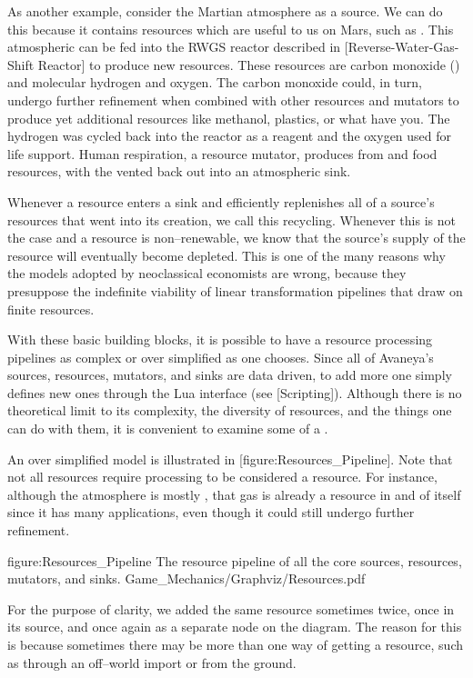 As another example, consider the Martian atmosphere as a source. We can do this because it contains resources which are useful to us on Mars, such as . This atmospheric  can be fed into the RWGS reactor described in [Reverse-Water-Gas-Shift Reactor] to produce new resources. These resources are carbon monoxide () and molecular hydrogen and oxygen. The carbon monoxide could, in turn, undergo further refinement when combined with other resources and mutators to produce yet additional resources like methanol, plastics, or what have you. The hydrogen was cycled back into the reactor as a reagent and the oxygen used for life support. Human respiration, a resource mutator, produces  from  and food resources, with the  vented back out into an atmospheric sink.

Whenever a resource enters a sink and efficiently replenishes all of a source's resources that went into its creation, we call this recycling. Whenever this is not the case and a resource is non--renewable, we know that the source's supply of the resource will eventually become depleted. This is one of the many reasons why the models adopted by neoclassical economists are wrong, because they presuppose the indefinite viability of linear transformation pipelines that draw on finite resources.

With these basic building blocks, it is possible to have a resource processing pipelines as complex or over simplified as one chooses. Since all of Avaneya's sources, resources, mutators, and sinks are data driven, to add more one simply defines new ones through the Lua interface (see [Scripting]). Although there is no theoretical limit to its complexity, the diversity of resources, and the things one can do with them, it is convenient to examine some of a .

An over simplified model is illustrated in [figure:Resources_Pipeline]. Note that not all resources require processing to be considered a resource. For instance, although the atmosphere is mostly , that gas is already a resource in and of itself since it has many applications, even though it could still undergo further refinement.

\FullPageDiagram
    {figure:Resources_Pipeline}
    {The resource pipeline of all the core sources, resources, mutators, and sinks.}
    {Game_Mechanics/Graphviz/Resources.pdf}

For the purpose of clarity, we added the same resource sometimes twice, once in its source, and once again as a separate node on the diagram. The reason for this is because sometimes there may be more than one way of getting a resource, such as through an off--world import or from the ground.

